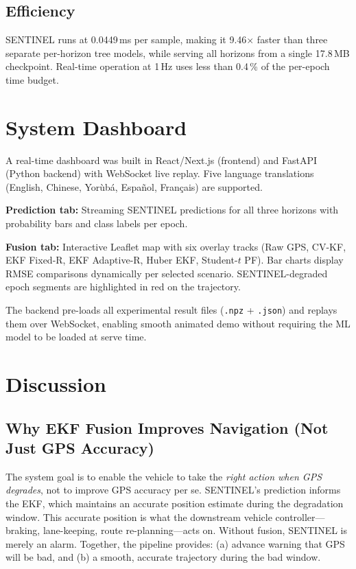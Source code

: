 \documentclass[12pt,a4paper]{article}
\begin{document}
\subsection{Efficiency}

SENTINEL runs at 0.0449\,ms per sample, making it 9.46$\times$ faster than three
separate per-horizon tree models, while serving all horizons from a single
17.8\,MB checkpoint.
Real-time operation at 1\,Hz uses less than 0.4\,\% of the per-epoch time budget.

\section{System Dashboard}
\label{sec:dashboard}

A real-time dashboard was built in React/Next.js (frontend) and FastAPI (Python backend)
with WebSocket live replay.
Five language translations (English, Chinese, Yor\`{u}b\'{a}, Espa\~{n}ol, Fran\c{c}ais) are supported.

\textbf{Prediction tab:} Streaming SENTINEL predictions for all three horizons
with probability bars and class labels per epoch.

\textbf{Fusion tab:} Interactive Leaflet map with six overlay tracks (Raw GPS,
CV-KF, EKF Fixed-R, EKF Adaptive-R, Huber EKF, Student-$t$ PF).
Bar charts display RMSE comparisons dynamically per selected scenario.
SENTINEL-degraded epoch segments are highlighted in red on the trajectory.

The backend pre-loads all experimental result files (\texttt{.npz} + \texttt{.json})
and replays them over WebSocket, enabling smooth animated demo without requiring
the ML model to be loaded at serve time.

\section{Discussion}
\label{sec:discussion}

\subsection{Why EKF Fusion Improves Navigation (Not Just GPS Accuracy)}

The system goal is to enable the vehicle to take the \emph{right action when GPS degrades},
not to improve GPS accuracy per se.
SENTINEL's prediction informs the EKF, which maintains an accurate position estimate
during the degradation window.
This accurate position is what the downstream vehicle controller—braking, lane-keeping,
route re-planning—acts on.
Without fusion, SENTINEL is merely an alarm.
Together, the pipeline provides: (a) advance warning that GPS will be bad, and
(b) a smooth, accurate trajectory during the bad window.
\end{document}
